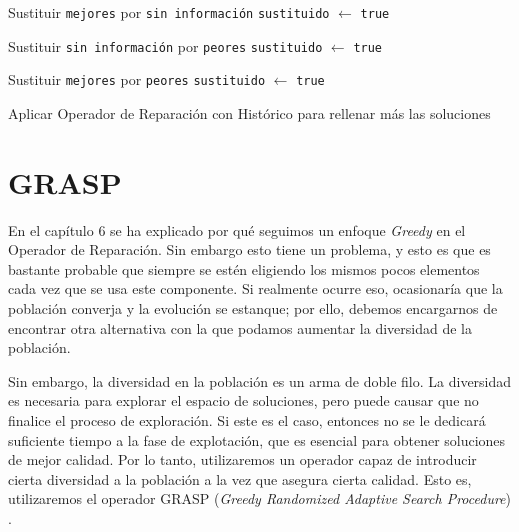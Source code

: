 \begin{algorithm}
\begin{algorithmic}[1]
	\State Sustituir \texttt{mejores} por \texttt{sin información}
	\State \texttt{sustituido} $\leftarrow{}{}$ \texttt{true}

	\State Sustituir \texttt{sin información} por \texttt{peores}
	\State \texttt{sustituido} $\leftarrow{}{}$ \texttt{true}

	\State Sustituir \texttt{mejores} por \texttt{peores}
	\State \texttt{sustituido} $\leftarrow{}{}$ \texttt{true}
	
\EndIf
\State Aplicar Operador de Reparación con Histórico para rellenar más las soluciones
\EndProcedure
\end{algorithmic}
\end{algorithm}

\section{GRASP}

En el capítulo 6 se ha explicado por qué seguimos un enfoque \textit{Greedy} en el Operador de Reparación. 
Sin embargo esto tiene un problema, y esto es que es bastante probable que siempre se estén eligiendo los mismos pocos elementos cada vez que se usa este componente. 
Si realmente ocurre eso, ocasionaría que la población converja y la evolución se estanque; por ello, debemos encargarnos de encontrar otra alternativa con la que podamos aumentar la diversidad de la población. 

Sin embargo, la diversidad en la población es un arma de doble filo. 
La diversidad es necesaria para explorar el espacio de soluciones, pero puede causar que no finalice el proceso de exploración. 
Si este es el caso, entonces no se le dedicará suficiente tiempo a la fase de explotación, que es esencial para obtener soluciones de mejor calidad. 
Por lo tanto, utilizaremos un operador capaz de introducir cierta diversidad a la población a la vez que asegura cierta calidad. 
Esto es, utilizaremos el operador GRASP (\textit{Greedy Randomized Adaptive Search Procedure}) \parencite{herrera-poyatosGeneticMemeticAlgorithm2017}. 

